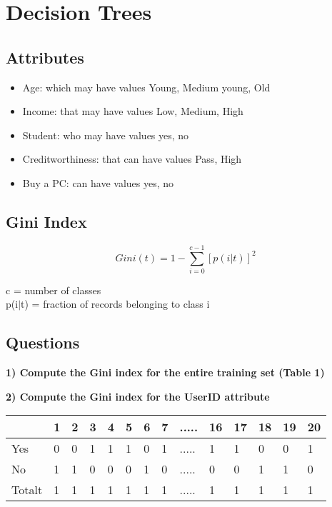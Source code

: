 \section{Decision Trees}

\subsection*{Attributes}
	\begin{itemize}
		\item Age: which may have values {Young, Medium young, Old}
		\item Income: that may have values {Low, Medium, High}
		\item Student: who may have values {yes, no}
		\item Creditworthiness: that can have values {Pass, High}
		\item Buy a PC: can have values {yes, no}
	\end{itemize}

\subsection*{Gini Index}

	
		\begin{equation}
		Gini(t) = 1 - \sum_{i=0}^{c-1} [p(i|t)]^{2} 
		\end{equation}
	
		c = number of classes \\
		p(i$|$t) = fraction of records belonging to class i


\subsection*{Questions}
	
		{\bf 1) Compute the Gini index for the entire training set (Table 1)}

		{\bf 2) Compute the Gini index for the UserID attribute}

		\begin{table}[H]
			\begin{tabular}{ l | l | l | l | l | l | l | l | l | l | l |l | l | l }
				 & 1 & 2 & 3 & 4 & 5 & 6 & 7 & ..... & 16 & 17 & 18 & 19 & 20  \\ \hline
				Yes & 0 & 0 & 1 & 1 & 1 & 0 & 1 & ..... & 1 & 1 & 0 & 0 & 1  \\ \hline 
				No & 1 & 1 & 0 & 0 & 0 & 1 & 0 & ..... & 0 & 0 & 1 & 1 & 0  \\ \hline
				Totalt & 1 & 1 & 1 & 1 & 1 & 1 & 1 & ..... & 1 & 1 & 1 & 1 & 1 \\
			\end{tabular}
		\end{table}

